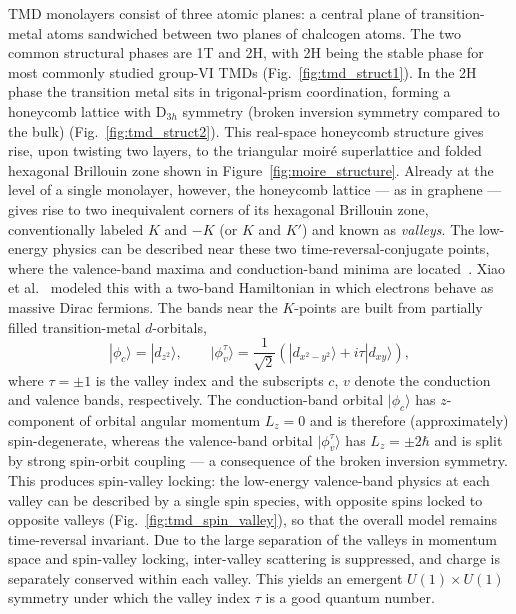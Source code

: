 TMD monolayers consist of three atomic planes: a central plane of transition-metal atoms sandwiched between two planes of chalcogen atoms. The two common structural phases are 1T and 2H, with 2H being the stable phase for most commonly studied group-VI TMDs (Fig.~\ref{fig:tmd_struct1}). In the 2H phase the transition metal sits in trigonal-prism coordination, forming a honeycomb lattice with $\text{D}_{3h}$ symmetry (broken inversion symmetry compared to the bulk) (Fig.~\ref{fig:tmd_struct2}). This real-space honeycomb structure gives rise, upon twisting two layers, to the triangular moir\'e superlattice and folded hexagonal Brillouin zone shown in Figure~\ref{fig:moire_structure}. Already at the level of a single monolayer, however, the honeycomb lattice --- as in graphene --- gives rise to two inequivalent corners of its hexagonal Brillouin zone, conventionally labeled $K$ and $-K$ (or $K$ and $K'$) and known as \emph{valleys}. The low-energy physics can be described near these two time-reversal-conjugate points, where the valence-band maxima and conduction-band minima are located~\cite{coehoorn1987electronic, kormanyos2015k}. Xiao et al.~\cite{xiao2012coupled} modeled this with a two-band Hamiltonian in which electrons behave as massive Dirac fermions. The bands near the $K$-points are built from partially filled transition-metal $d$-orbitals,
\begin{equation}
    | \phi_c \rangle = | d_{z^2} \rangle, \qquad | \phi_v^\tau \rangle = \frac{1}{\sqrt{2}} \left( | d_{x^2 - y^2} \rangle + i \tau | d_{xy} \rangle \right),
    \label{eq:tmd_orbitals}
\end{equation}
where $\tau = \pm 1$ is the valley index and the subscripts $c$, $v$ denote the conduction and valence bands, respectively. The conduction-band orbital $|\phi_c\rangle$ has $z$-component of orbital angular momentum $L_z = 0$ and is therefore (approximately) spin-degenerate, whereas the valence-band orbital $|\phi_v^\tau\rangle$ has $L_z = \pm 2\hbar$ and is split by strong spin-orbit coupling --- a consequence of the broken inversion symmetry. This produces spin-valley locking: the low-energy valence-band physics at each valley can be described by a single spin species, with opposite spins locked to opposite valleys (Fig.~\ref{fig:tmd_spin_valley}), so that the overall model remains time-reversal invariant. Due to the large separation of the valleys in momentum space and spin-valley locking, inter-valley scattering is suppressed, and charge is separately conserved within each valley. This yields an emergent $U(1) \times U(1)$ symmetry under which the valley index $\tau$ is a good quantum number.

